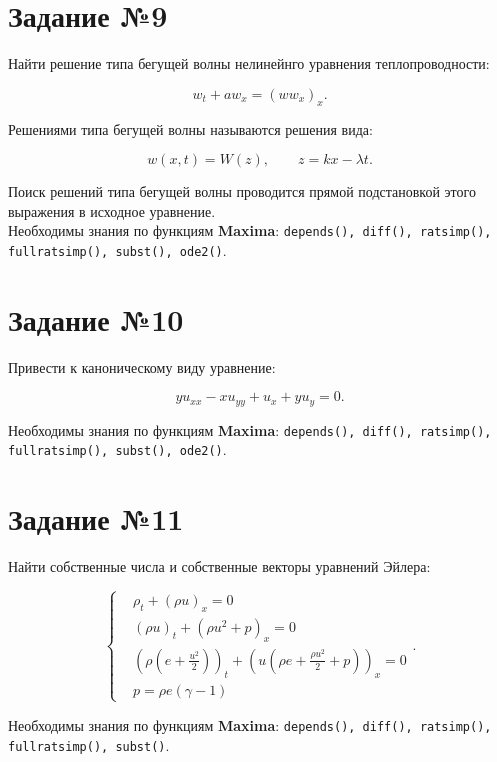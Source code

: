 \section*{Задание №9}

    Найти решение типа бегущей волны нелинейнго уравнения теплопроводности: 

    \[
        w_{t} + a w_{x} =  \left( w w_{x} \right)_{x}.
    \]

    Решениями типа бегущей волны называются решения вида:

    \[
        w(x, t) = W(z), \qquad z = k x - \lambda t.
    \]

    Поиск решений типа бегущей волны проводится прямой подстановкой этого выражения в исходное уравнение.\\

    Необходимы знания по функциям \textbf{Maxima}: {\tt depends(), diff(), ratsimp(), fullratsimp(), subst(), ode2()}.

\section*{Задание №10}

	Привести к каноническому виду уравнение:

	\[
		y u_{xx} - x u_{yy} + u_{x} + y u_{y} = 0.
	\]

	Необходимы знания по функциям \textbf{Maxima}: {\tt depends(), diff(), ratsimp(), fullratsimp(), subst(), ode2()}.

\section*{Задание №11}

	Найти собственные числа и собственные векторы уравнений Эйлера:
	
	\begin{equation}
		\begin{cases}
			& \rho_{t} + \left( \rho u \right)_{x} = 0 \\
			& \left( \rho u \right)_{t} + \left( \rho u^{2} + p \right)_{x} = 0 \\
			& \left( \rho \left( e + \frac{u^{2}}{2} \right) \right)_{t} + \left( u \left( \rho e + \frac{\rho u^{2}}{2} + p \right) \right)_{x} = 0 \\
			& p = \rho e \left( \gamma - 1 \right)
		\end{cases}.
	\end{equation}
	
	Необходимы знания по функциям \textbf{Maxima}: {\tt depends(), diff(), ratsimp(), fullratsimp(), subst()}.

    \newpage